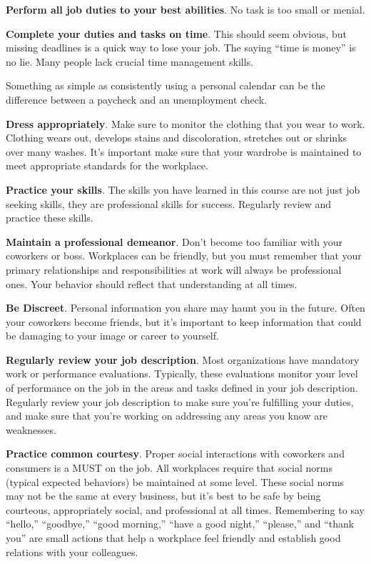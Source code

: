 \textbf{Perform all job duties to your best abilities}. No task is too small or menial.

\textbf{Complete your duties and tasks on time}. This should seem obvious, but missing deadlines is a quick way to lose your job. The saying ``time is money'' is no lie. Many people lack crucial time management skills.

Something as simple as consistently using a personal calendar can be the difference between a paycheck and an unemployment check.

\textbf{Dress appropriately}. Make sure to monitor the clothing that you wear to work. Clothing wears out, develops stains and discoloration, stretches out or shrinks over many washes. It's important make sure that your wardrobe is maintained to meet appropriate standards for the workplace.

\textbf{Practice your skills}. The skills you have learned in this course are not just job seeking skills, they are professional skills for success. Regularly review and practice these skills.

\textbf{Maintain a professional demeanor}. Don't become too familiar with your coworkers or boss. Workplaces can be friendly, but you must remember that your primary relationships and responsibilities at work will always be professional ones. Your behavior should reflect that understanding at all times.

\textbf{Be Discreet}. Personal information you share may haunt you in the future. Often your coworkers become friends, but it's important to keep information that could be damaging to your image or career to yourself.

\textbf{Regularly review your job description}. Most organizations have mandatory work or performance evaluations. Typically, these evaluations monitor your level of performance on the job in the areas and tasks defined in your job description. Regularly review your job description to make sure you're fulfilling your duties, and make sure that you're working on addressing any areas you know are weaknesses.

\textbf{Practice common courtesy}. Proper social interactions with coworkers and consumers is a MUST on the job. All workplaces require that social norms (typical expected behaviors) be maintained at some level. These social norms may not be the same at every business, but it's best to be safe by being courteous, appropriately social, and professional at all times. Remembering to say ``hello,'' ``goodbye,'' ``good morning,'' ``have a good night,'' ``please,'' and ``thank you'' are small actions that help a workplace feel friendly and establish good relations with your colleagues.

